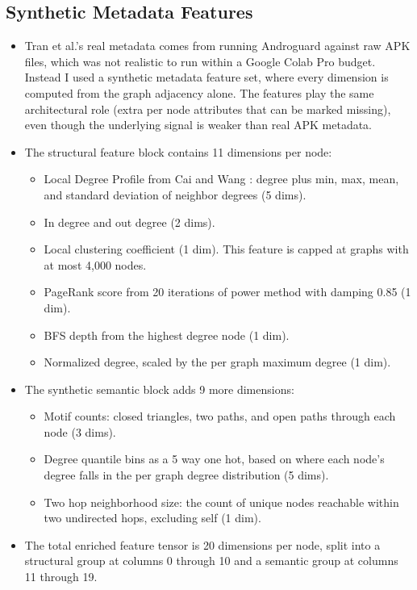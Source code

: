 \documentclass[12pt]{article}
\begin{document}
\subsection{Synthetic Metadata Features}

\begin{itemize}
    \item Tran et al.'s real metadata comes from running Androguard against raw APK files, which was not realistic to run within a Google Colab Pro budget. Instead I used a synthetic metadata feature set, where every dimension is computed from the graph adjacency alone. The features play the same architectural role (extra per node attributes that can be marked missing), even though the underlying signal is weaker than real APK metadata.
    \item The structural feature block contains 11 dimensions per node:
        \begin{itemize}
            \item Local Degree Profile from Cai and Wang \cite{cai2018ldp}: degree plus min, max, mean, and standard deviation of neighbor degrees (5 dims).
            \item In degree and out degree (2 dims).
            \item Local clustering coefficient (1 dim). This feature is capped at graphs with at most 4,000 nodes.
            \item PageRank score from 20 iterations of power method with damping 0.85 (1 dim).
            \item BFS depth from the highest degree node (1 dim).
            \item Normalized degree, scaled by the per graph maximum degree (1 dim).
        \end{itemize}
    \item The synthetic semantic block adds 9 more dimensions:
        \begin{itemize}
            \item Motif counts: closed triangles, two paths, and open paths through each node (3 dims).
            \item Degree quantile bins as a 5 way one hot, based on where each node's degree falls in the per graph degree distribution (5 dims).
            \item Two hop neighborhood size: the count of unique nodes reachable within two undirected hops, excluding self (1 dim).
        \end{itemize}
    \item The total enriched feature tensor is 20 dimensions per node, split into a structural group at columns 0 through 10 and a semantic group at columns 11 through 19.
\end{itemize}
\end{document}
